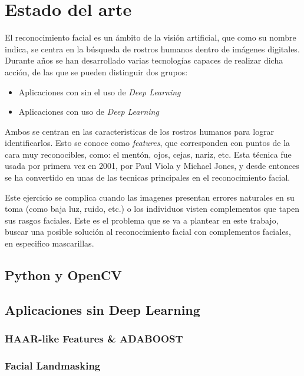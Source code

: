 
\chapter{Estado del arte}

El reconocimiento facial es un ámbito de la visión artificial, que como su nombre indica, se centra en la búsqueda de rostros humanos dentro de imágenes digitales. Durante años se han desarrollado varias tecnologías capaces de realizar dicha acción, de las que se pueden distinguir dos grupos:

\begin{itemize}
	\item Aplicaciones con sin el uso de \textit{Deep Learning}
	\item Aplicaciones con uso de \textit{Deep Learning}
\end{itemize}

Ambos se centran en las caracteristicas de los rostros humanos para lograr identificarlos. Esto se conoce como \textit{features}, que corresponden con puntos de la cara muy reconocibles, como: el mentón, ojos, cejas, nariz, etc. Esta técnica fue usada por primera vez en 2001, por Paul Viola y Michael Jones, y desde entonces se ha convertido en unas de las tecnicas principales en el reconocimiento facial.

Este ejercicio se complica cuando las imagenes presentan errores naturales en su toma (como baja luz, ruido, etc.) o los individuos visten complementos que tapen sus rasgos faciales. Este es el problema que se va a plantear en este trabajo, buscar una posible solución al reconocimiento facial con complementos faciales, en especifico mascarillas.

\section{Python y OpenCV}


\section{Aplicaciones sin Deep Learning}


\subsection*{HAAR-like Features \& ADABOOST}


\subsection*{Facial Landmasking}


